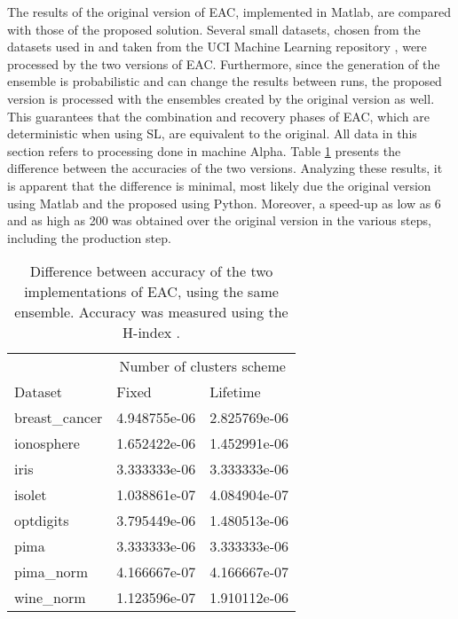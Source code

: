 The results of the original version of EAC, implemented in Matlab, are compared with those of the proposed solution.
Several small datasets, chosen from the datasets used in \cite{Lourenco2010} and taken from the UCI Machine Learning repository \cite{Lichman:2013}, were processed by the two versions of EAC.
Furthermore, since the generation of the ensemble is probabilistic and can change the results between runs, the proposed version is processed with the ensembles created by the original version as well.
This guarantees that the combination and recovery phases of EAC, which are deterministic when using SL, are equivalent to the original.
All data in this section refers to processing done in machine Alpha.
Table \ref{tab:validation error acc} presents the difference between the accuracies of the two versions.
Analyzing these results, it is apparent that the difference is minimal, most likely due the original version using Matlab and the proposed using Python.
Moreover, a speed-up as low as 6 and as high as 200 was obtained over the original version in the various steps, including the production step. %


\begin{table}[h]
\centering
\caption{Difference between accuracy of the two implementations of EAC, using the same ensemble. Accuracy was measured using the H-index \cite{Meila2003}.}

\begin{tabular}{lll}
\toprule
         &        \multicolumn{2}{c}{Number of clusters scheme} \\
Dataset &      Fixed & Lifetime \\
\midrule
breast\_cancer &  4.948755e-06 &     2.825769e-06 \\
ionosphere     &  1.652422e-06 &     1.452991e-06 \\
iris           &  3.333333e-06 &     3.333333e-06 \\
isolet         &  1.038861e-07 &     4.084904e-07 \\
optdigits      &  3.795449e-06 &     1.480513e-06 \\
pima           &  3.333333e-06 &     3.333333e-06 \\
pima\_norm     &  4.166667e-07 &     4.166667e-07 \\
wine\_norm     &  1.123596e-07 &     1.910112e-06 \\
\bottomrule
\end{tabular}

\label{tab:validation error acc}
\end{table}

